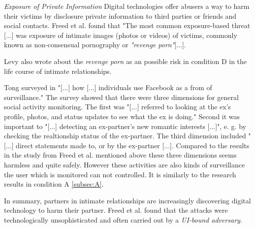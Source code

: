 \textit{Exposure of Private Information}
Digital technologies offer abusers a way to harm their victims by disclosure private information to third parties or friends and social contacts. Freed et al. found that "The most common exposure-based threat [...] was exposure of intimate images (photos or videos) of victims, commonly known as non-consensual pornography or \textit{"revenge porn"}[...].

Levy also wrote about the \textit{revenge porn} as an possible risk in condition D in the life course of intimate relationships.

Tong surveyed in \cite{Tong2013Facebook} "[...] how [...] individuals use Facebook as a from of surveillance." The survey showed that there were three dimensions for general social activity monitoring. The first was "[...] referred to looking at the ex's profile, photos, and status updates to see what the ex is doing." Second it was important to "[...] detecting an ex-partner's new romantic interests [...]", e. g. by checking the realtionship status of the ex-partner. The third dimension included "[...] direct statements made to, or by the ex-partner [...].
Compared to the results in the study from Freed et al. \cite{freed2018stalker} mentioned above these three dimensions seems harmless and quite safely. However these activities are also kinds of surveillance the user which is monitored can not controlled. It is similarly to the research results in condition A \ref*{subsec:A}.

In summary, partners in intimate relationships are increasingly discovering digital technology to harm their partner. Freed et al. \cite{freed2018stalker} found that the attacks were technologically unsophisticated and often carried out by a \textit{UI-bound adversary}.










